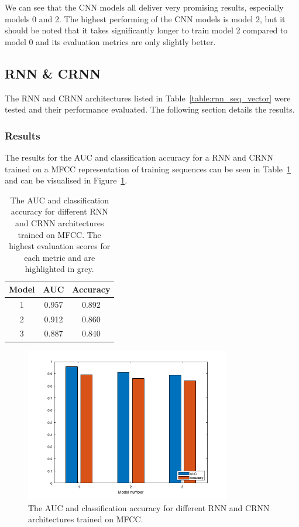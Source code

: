We can see that the CNN models all deliver very promising results, especially
models 0 and 2. The highest performing of the CNN models is model 2, but it
should be noted that it takes significantly longer to train model 2 compared to
model 0 and its evaluation metrics are only slightly better.

\subsection{RNN \& CRNN}

The RNN and CRNN architectures listed in Table~\ref{table:rnn_seq_vector} were
tested and their performance evaluated. The following section details the
results.

\subsubsection{Results}

The results for the AUC and classification accuracy for a RNN and CRNN trained
on a MFCC representation of training sequences can be seen in
Table~\ref{table:rnn_mfcc_results} and can be visualised in
Figure~\ref{fig:rnn_mfcc_results}.

\begin{table}[ht]
\begin{center}
\begin{tabular}{c c c}
\toprule
Model & AUC & Accuracy \\ [0.5ex]
\midrule
1 & \cellcolor{lightgray} 0.957 & \cellcolor{lightgray} 0.892 \\
2 & 0.912 & 0.860 \\
3 & 0.887 & 0.840 \\
\bottomrule
\end{tabular}
\caption{The AUC and classification accuracy for different RNN and CRNN
architectures trained on MFCC\@. The highest evaluation scores for each metric
and are highlighted in grey.}\label{table:rnn_mfcc_results}
\end{center}
\end{table}

\begin{figure}[ht]
  \centering
  \includegraphics[width=0.8\textwidth]{figures/hyp2_rnn_mfcc_results.png}
  \caption{The AUC and classification accuracy for different RNN and CRNN architectures
  trained on MFCC.}\label{fig:rnn_mfcc_results}
\end{figure}

